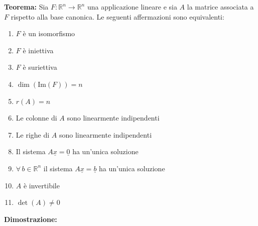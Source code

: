 \documentclass[
  a4paper,
]{article}
\providecommand{\tightlist}{%
  \setlength{\itemsep}{0pt}\setlength{\parskip}{0pt}}
\providecommand{\tightlist}{}
\begin{document}
\textbf{Teorema:} Sia \(F : \mathbb{R}^n \to \mathbb{R}^n\) una
applicazione lineare e sia \(A\) la matrice associata a \(F\) rispetto
alla base canonica. Le seguenti affermazioni sono equivalenti:

\begin{enumerate}
\def\labelenumi{\arabic{enumi}.}
\tightlist
\item
  \(F\) è un isomorfismo
\item
  \(F\) è iniettiva
\item
  \(F\) è suriettiva
\item
  \(\dim(\text{Im}(F))=n\)
\item
  \(r(A) = n\)
\item
  Le colonne di \(A\) sono linearmente indipendenti
\item
  Le righe di \(A\) sono linearmente indipendenti
\item
  Il sistema \(A\underline{x} = \underline{0}\) ha un'unica soluzione
\item
  \(\forall\, b \in \mathbb{R}^n\) il sistema
  \(A\underline{x} = \underline{b}\) ha un'unica soluzione
\item
  \(A\) è invertibile
\item
  \(\det(A) \not = 0\)
\end{enumerate}

\textbf{Dimostrazione:}
\end{document}
